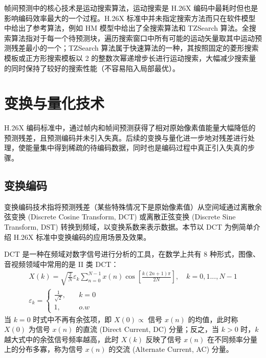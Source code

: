 帧间预测中的核心技术是运动搜索算法，运动搜索是 H.26X 编码中最耗时但也是影响编码效率最大的一个过程。H.26X 标准中并未指定搜索方法而只在软件模型中给出了参考算法，例如 HM 模型中给出了全搜索算法和 TZSearch 算法。全搜索算法指对于每一个待预测块，遍历搜索窗口中所有可能的运动矢量取其中运动预测残差最小的一个；TZSearch 算法属于快速算法的一种，其按照固定的菱形搜索模板或正方形搜索模板以 2 的整数次幂递增步长进行运动搜索，大幅减少搜索量的同时保持了较好的搜索性能（不容易陷入局部最优）。

\section{变换与量化技术}
H.26X 编码标准中，通过帧内和帧间预测获得了相对原始像素值能量大幅降低的预测残差，且预测编码并未引入失真。后续的变换与量化进一步地对残差进行处理，使能量集中得到稀疏的待编码数据，同时也是编码过程中真正引入失真的步骤。
\subsection{变换编码}
\label{cha:TransformOverview}
变换编码技术指将预测残差（某些特殊情况下是原始像素值）从空间域通过离散余弦变换 (Discrete Cosine Transform, DCT) 或离散正弦变换 (Discrete Sine Transform, DST) 转换到频域，以变换系数来表示数据。本节以 DCT 为例简单介绍 H.26X 标准中变换编码的应用场景及效果。

DCT 是一种在频域对数字信号进行分析的工具，在数学上共有 8 种形式，图像、音视频领域中常用的是 II 类 DCT：
\begin{equation}
    \begin{gathered}
        X(k) = \sqrt{\frac{2}{N}}\varepsilon_{k}\sum_{n=0}^{N-1}x(n)\cos\left[\frac{k(2n+1)\pi}{2N}\right], \quad k=0,1...,N-1 \\
        \varepsilon_{k}= \left\{
        \begin{aligned}
            \frac{1}{\sqrt{2}}, \quad & k=0 \\
            1, \quad                  & o.w
        \end{aligned} \right.
    \end{gathered}
    \label{equ:1ddct}
\end{equation}
当 $k=0$ 时式中不再有余弦项，即 $X(0)\propto$ 信号 $x(n)$ 的均值，此时称 $X(0)$ 为信号 $x(n)$ 的直流 (Direct Current, DC) 分量；反之，当 $k>0$ 时，$k$ 越大式中的余弦信号频率越高，此时 $X(k)$ 反映了信号 $x(n)$ 在不同频率分量上的分布多寡，称为信号 $x(n)$ 的交流 (Alternate Current, AC) 分量。

